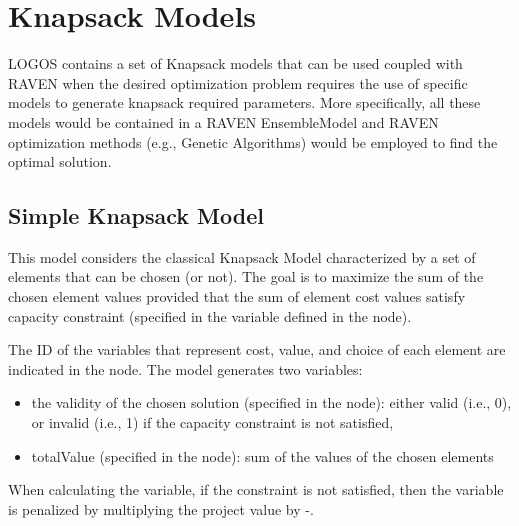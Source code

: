 \section{Knapsack Models}
\label{sec:KnapsackModels}

LOGOS contains a set of Knapsack models that can be used coupled with RAVEN when 
the desired optimization problem requires the use of specific models to generate
knapsack required parameters.
More specifically, all these models would be contained in a RAVEN EnsembleModel 
and RAVEN optimization methods (e.g., Genetic Algorithms) would be employed to 
find the optimal solution.


\subsection{Simple Knapsack Model}
\label{subsec:SimpleKnapsackModel}
This model considers the classical Knapsack Model characterized by a set of elements 
that can be chosen (or not).
The goal is to maximize the sum of the chosen element values provided that the sum of 
element cost values satisfy capacity constraint (specified in the variable defined 
in the  node).

The ID of the variables that represent cost, value, and choice of each element are 
indicated in the  node.
The model generates two variables:
\begin{itemize}
  \item the validity of the chosen solution (specified in the  node): either 
        valid (i.e., 0), or invalid (i.e., 1) if the capacity constraint is not satisfied,
  \item totalValue (specified in the  node): sum of the values of the 
        chosen elements
\end{itemize}

When calculating the  variable, if the  constraint 
is not satisfied, then the  variable is penalized by multiplying the 
project value by -.

